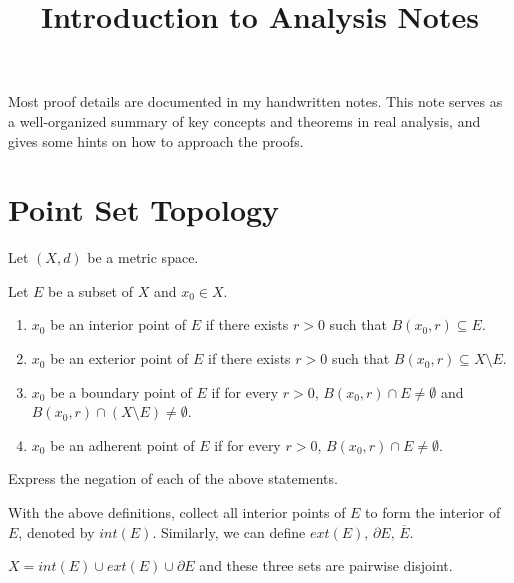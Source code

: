 \documentclass[12pt]{article}
\title{Introduction to Analysis Notes}
\begin{document}
\maketitle

\begin{mybox}
Most proof details are documented in my handwritten notes.
This note serves as a well-organized summary of key concepts and theorems in real analysis,
and gives some hints on how to approach the proofs.
\end{mybox}

\section{Point Set Topology}

Let $(X,d)$ be a metric space. 

\begin{definition}
Let $E$ be a subset of $X$ and $x_0 \in X$.
    \begin{enumerate}
        \item $x_0$ be an interior point of $E$ if there exists $r > 0$ such that $B(x_0,r) \subseteq E$.
        \item $x_0$ be an exterior point of $E$ if there exists $r > 0$ such that $B(x_0,r) \subseteq X\setminus E$.
        \item $x_0$ be a boundary point of $E$ if for every $r > 0$, $B(x_0,r)\cap E\neq \emptyset$ and $B(x_0,r)\cap (X\setminus E)\neq \emptyset$.
        \item $x_0$ be an adherent point of $E$ if for every $r > 0$, $B(x_0,r)\cap E\neq \emptyset$.
    \end{enumerate}
\end{definition}

\begin{exercise}
    Express the negation of each of the above statements.
\end{exercise}

With the above definitions, collect all interior points of $E$ to form the interior of $E$, denoted by $int(E)$. 
Similarly, we can define $ext(E),\, \partial E,\, \overline{E}$.

\begin{theorem}
    $X = int(E) \cup ext(E) \cup \partial E$ and these three sets are pairwise disjoint.
\end{theorem}
\end{document}
